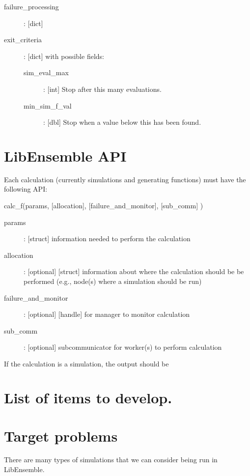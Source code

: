 \documentclass{article}
\newenvironment{allintypewriter}{\ttfamily}{\par}
\begin{document}
\begin{allintypewriter}
\begin{description}
    \item[failure\_processing]: [dict]

    \item[exit\_criteria]: [dict] with possible fields:
      \begin{description}
        \item[sim\_eval\_max]: [int] Stop after this many evaluations.
        \item[min\_sim\_f\_val]: [dbl] Stop when a value below this has been found.
      \end{description}
  \end{description}
\end{allintypewriter}
        


\section{LibEnsemble API}
Each calculation (currently simulations and generating functions) must have the following API:

\begin{allintypewriter}
  calc\_f(params, [allocation], [failure\_and\_monitor], [sub\_comm] )\\

  \begin{description}
    \item[params]: [struct] information needed to perform the calculation
    \item[allocation]: [optional] [struct] information about where the calculation should be be performed (e.g., node(s) where a simulation should be run)
    \item[failure\_and\_monitor]: [optional] [handle] for manager to monitor calculation
    \item[sub\_comm]: [optional] subcommunicator for worker(s) to perform calculation
  \end{description} 
\end{allintypewriter}

If the calculation is a simulation, the output should be 


\section{List of items to develop.}



\section{Target problems}
There are many types of simulations that we can consider being run in LibEnsemble.
\end{document}
